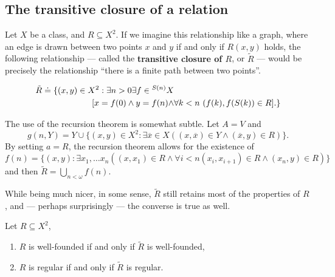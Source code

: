 \documentclass[twoside,openright,titlepage,numbers=noenddot,%
               headinclude,footinclude,cleardoublepage=empty,abstract=on,
               BCOR=23mm,paper=letter,fontsize=11pt
               ]{scrreprt}
\begin{document}
\subsection{The transitive closure of a relation}
Let $X$ be a class, and $R \subseteq X^2$. If we imagine this relationship like a graph, where an edge is drawn between two points $x$ and $y$ if and only if $R(x,y)$ holds, the following relationship --- called the \textbf{transitive closure of $R$}, or $\tilde{R}$ --- would be precisely the relationship ``there is a finite path between two points''.
\begin{definition}
    \begin{align*}
        \tilde{R} \hskip1mm\dot{=}\hskip1mm \{ (x,y) \in X^2: \exists n > 0 \exists f \in {}^{S(n)}X & \\
        [x = f(0) \land y = f(n) \land& \forall k < n \ (f(k), f(S(k)) \in R]. \}
    \end{align*}
\end{definition}
\begin{remark}
    The use of the recursion theorem is somewhat subtle. Let $A = V$ and 
    \[ g(n,Y) = Y \cup \{ (x,y) \in X^2: \exists \overline{x} \in X ((x,\overline{x}) \in Y \land (\overline{x},y) \in R) \}. \]
    By setting $a = R$, the recursion theorem allows for the existence of 
    \[ f(n) = \{ (x,y): \exists x_1,\dots x_n ((x,x_1) \in R \land \forall i < n (x_i,x_{i+1}) \in R \land (x_n,y) \in R) \} \]
    and then $\tilde{R} = \bigcup_{n < \omega} f(n)$.
\end{remark}
While being much nicer, in some sense, $\tilde{R}$ still retains most of the properties of $R$, and --- perhaps surprisingly --- the converse is true as well.
\begin{proposition}
    Let $R \subseteq X^2$,
    \begin{enumerate}
        \item $R$ is well-founded if and only if $\tilde{R}$ is well-founded,
        \item $R$ is regular if and only if $\tilde{R}$ is regular.
    \end{enumerate}
\end{proposition}
\end{document}
